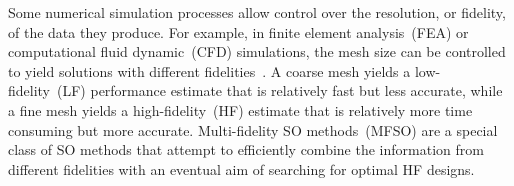 

Some numerical simulation processes allow control over the resolution, or fidelity, of the data they produce. For example, in finite element analysis~(FEA) or computational fluid dynamic~(CFD) simulations, the mesh size can be controlled to yield solutions with different fidelities~\cite{branke2016efficient}. A coarse mesh yields a low-fidelity~(LF) performance estimate that is relatively fast but less accurate, while a fine mesh yields a high-fidelity~(HF) estimate that is relatively more time consuming but more accurate. Multi-fidelity SO methods~(MFSO) are a special class of SO methods that attempt to efficiently combine the information from different fidelities with an eventual aim of searching for optimal HF designs. 

% 


